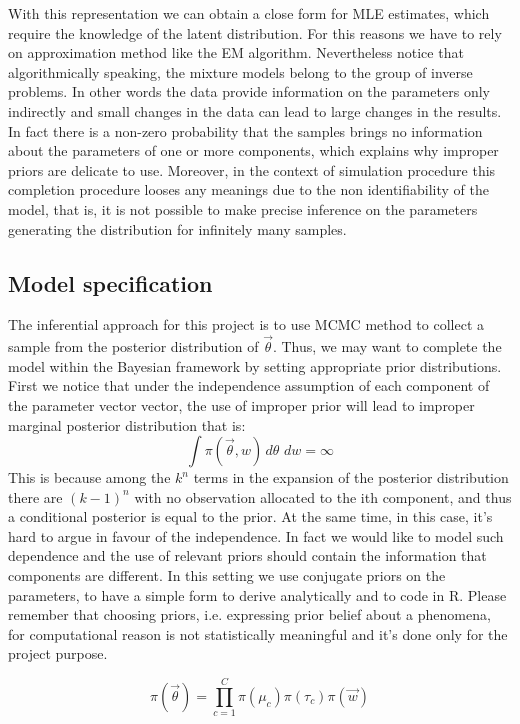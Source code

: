 \documentclass{article}
\begin{document}
With this representation we can obtain a close form for MLE estimates, which require the knowledge of the latent distribution. For this reasons we have to rely on approximation method like the EM algorithm. Nevertheless notice that  algorithmically speaking, the mixture models belong to the group of inverse problems. In other words the data provide information on the parameters only indirectly and small changes in the data can lead to large changes in the results. In fact there is a non-zero probability that the samples brings no information about the parameters of one or more components, which explains why improper priors are delicate to use. Moreover, in the context of simulation procedure this completion procedure looses any meanings due to the non identifiability of the model, that is, it is not possible to make precise inference on the parameters generating the distribution for infinitely many samples.

\subsection{Model specification}
The inferential approach for this project is to use MCMC method to collect a sample from the posterior distribution of $\vec \theta$. Thus, we may want to complete the model within the Bayesian framework by setting appropriate prior distributions. First we notice that under the independence assumption of each component of the parameter vector vector, the use of improper prior will lead to improper marginal posterior distribution that is:
\begin{equation}
\int \pi(\vec \theta, w) \,d \theta \, \,dw = \infty
\end{equation}
This is because among the $k^n$ terms in the expansion of the posterior distribution there are $(k-1)^n$ with no observation allocated to the ith component, and thus a conditional posterior is equal to the prior. At the same time, in this case, it's hard to argue in favour of the independence. In fact we would like to model such dependence and the use of relevant priors should contain the information that components are different. In this setting we use conjugate priors on the parameters, to have a simple form to derive analytically and to code in R. Please remember that choosing priors, i.e. expressing prior belief about a phenomena, for computational reason is not statistically meaningful and it's done only for the project purpose. 

\begin{equation}
\pi(\vec \theta) = \prod_{c=1}^C \pi(\mu_c) \pi(\tau_c) \pi(\vec w)  
\end{equation}
\end{document}
